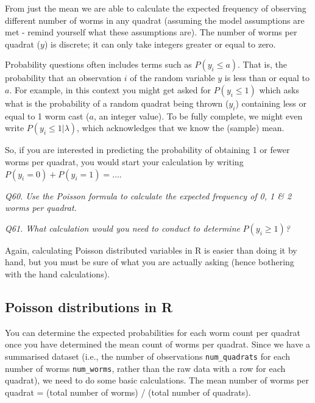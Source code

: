 \documentclass[
  11pt,
  a4paper,
]{book}
\newenvironment{Shaded}{\begin{snugshade}}{\end{snugshade}}
\newcommand{\CommentTok}[1]{\textcolor[rgb]{0.56,0.35,0.01}{\textit{#1}}}
\newcommand{\FunctionTok}[1]{\textcolor[rgb]{0.00,0.00,0.00}{#1}}
\newcommand{\NormalTok}[1]{#1}
\newcommand{\SpecialCharTok}[1]{\textcolor[rgb]{0.00,0.00,0.00}{#1}}
\begin{document}
From just the mean we are able to calculate the expected frequency of observing different number of worms in any quadrat (assuming the model assumptions are met - remind yourself what these assumptions are). The number of worms per quadrat (\(y\)) is discrete; it can only take integers greater or equal to zero.

Probability questions often includes terms such as \(P(y_i \leq a)\). That is, the probability that an observation \(i\) of the random variable \(y\) is less than or equal to \(a\). For example, in this context you might get asked for \(P(y_i \leq 1)\) which asks what is the probability of a random quadrat being thrown (\(y_i\)) containing less or equal to 1 worm cast (\(a\), an integer value). To be fully complete, we might even write \(P(y_i \leq 1 | \lambda)\), which acknowledges that we know the (sample) mean.

So, if you are interested in predicting the probability of obtaining 1 or fewer worms per quadrat, you would start your calculation by writing \(P(y_i = 0) + P(y_i=1) = \dots\).

\emph{Q60. Use the Poisson formula to calculate the expected frequency of 0, 1 \& 2 worms per quadrat.}

\emph{Q61. What calculation would you need to conduct to determine }\(P(y_i \geq 1)\)\emph{?}

Again, calculating Poisson distributed variables in R is easier than doing it by hand, but you must be sure of what you are actually asking (hence bothering with the hand calculations).

\hypertarget{poisson-distributions-in-r}{%
\subsection{Poisson distributions in R}\label{poisson-distributions-in-r}}

You can determine the expected probabilities for each worm count per quadrat once you have determined the mean count of worms per quadrat. Since we have a summarised dataset (i.e., the number of observations \texttt{num\_quadrats} for each number of worms \texttt{num\_worms}, rather than the raw data with a row for each quadrat), we need to do some basic calculations. The mean number of worms per quadrat = (total number of worms) / (total number of quadrats).

\begin{Shaded}
\end{Shaded}
\end{document}
